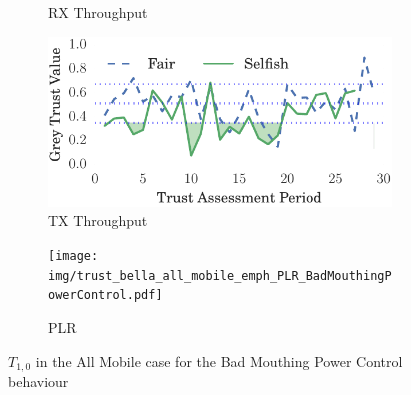 \documentclass[runningheads,a4paper]{llncs}
\begin{document}
\begin{figure}
\begin{subfigure}{0.32\textwidth}
  \caption{RX Throughput}
  \label{fig:all_mobile_badmouthing_rxthroughput}
\end{subfigure}
\begin{subfigure}{0.32\textwidth}
\centering
  \includegraphics[width=.95\linewidth]{img/trust_bella_all_mobile_emph_TXThroughput_BadMouthingPowerControl.pdf}
  \caption{TX Throughput}
  \label{fig:all_mobile_badmouthing_txthroughput}
\end{subfigure}
\begin{subfigure}{0.32\textwidth}
\centering
  \texttt{[image: img/trust\_bella\_all\_mobile\_emph\_PLR\_BadMouthingPowerControl.pdf]}
  \caption{PLR}
  \label{fig:all_mobile_badmouthing_plr}
\end{subfigure}
\caption{$T_{1,0}$ in the All Mobile case for the Bad Mouthing Power Control behaviour}
\label{fig:all_mobile_badmouthing}
\end{figure}
\end{document}
